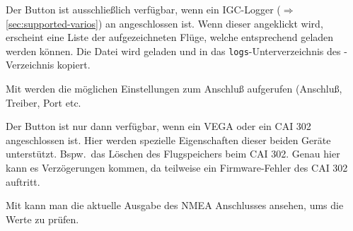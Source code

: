 Der Button  ist ausschließlich verfügbar, wenn ein IGC-Logger ($\Rightarrow$ \ref{sec:supported-varios}) an \xc angeschlossen ist. 
Wenn dieser angeklickt wird, erscheint eine Liste der aufgezeichneten Flüge, welche entsprechend geladen werden können.  Die Datei wird geladen und in das \texttt{logs}-Unterverzeichnis des  \xc  - Verzeichnis kopiert.

Mit  werden die möglichen Einstellungen zum  Anschluß aufgerufen (Anschluß, Treiber, Port etc.\   

Der Button  ist nur dann verfügbar, wenn ein VEGA oder ein CAI 302 angeschlossen ist. Hier werden spezielle Eigenschaften dieser beiden Geräte unterstützt.  Bspw.\  das Löschen des Flugspeichers beim CAI 302. \warning Genau hier kann es Verzögerungen kommen, da teilweise ein Firmware-Fehler  des CAI 302 auftritt.

Mit  kann man die aktuelle Ausgabe des NMEA Anschlusses ansehen, ums die Werte zu prüfen. 
